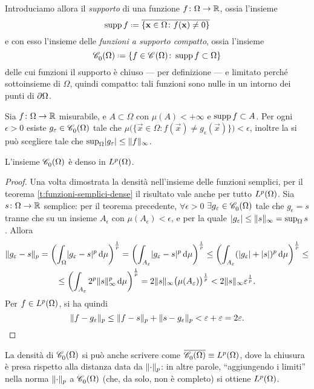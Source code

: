 Introduciamo allora il \emph{supporto} di una funzione $f\colon\Omega\to\R$, ossia l'insieme
\begin{equation*}
    \supp f\defeq\clos{\{\vec x\in\Omega\colon f(\vec x)\ne 0\}}
\end{equation*}
e con esso l'insieme delle \emph{funzioni a supporto compatto}, ossia l'insieme
\begin{equation*}
    \contsc{\Omega}\defeq\{f\in\cont{\Omega}\colon \supp f\subset\Omega\}
\end{equation*}
delle cui funzioni il supporto è chiuso --- per definizione --- e limitato perch\'e sottoinsieme di $\Omega$, quindi compatto: tali funzioni sono nulle in un intorno dei punti di $\boundary\Omega$.
\begin{teorema}[Lusin] \label{t:lusin}
    Sia $f\colon\Omega\to\R$ misurabile, e $A\subset\Omega$ con $\mu(A)<+\infty$ e $\supp f\subset A$.
    Per ogni $\epsilon>0$ esiste $g_\epsilon\in\contsc{\Omega}$ tale che $\mu\bigl(\{\vec x\in\Omega\colon f(\vec x)\ne g_\epsilon(\vec x)\}\bigr)<\epsilon$, inoltre la si può scegliere tale che $\sup_\Omega\abs{g_\epsilon}\le\norm{f}_{\infty}$.
\end{teorema}
\begin{teorema} \label{t:funzioni-continue-supporto-compatto-dense}
    L'insieme $\contsc{\Omega}$ è denso in $\leb[p]{\Omega}$.
\end{teorema}
\begin{proof}
    Una volta dimostrata la densità nell'insieme delle funzioni semplici, per il teorema \ref{t:funzioni-semplici-dense} il risultato vale anche per tutto $\leb[p]{\Omega}$.
    Sia $s\colon\Omega\to\R$ semplice: per il teorema precedente, $\forall\epsilon>0$ $\exists g_\epsilon\in\contsc{\Omega}$ tale che $g_\epsilon=s$ tranne che su un insieme $A_\epsilon$ con $\mu(A_\epsilon)<\epsilon$, e per la quale $\abs{g_\epsilon}\le\norm{s}_\infty=\sup_\Omega s$.
    Allora
    \begin{multline}
        \norm{g_\epsilon-s}_p=
        \biggl(\int_\Omega\abs{g_\epsilon-s}^p\,\dd\mu\biggr)^\frac1{p}=
        \biggl(\int_{A_\epsilon}\abs{g_\epsilon-s}^p\,\dd\mu\biggr)^\frac1{p}\le
        \biggl(\int_{A_\epsilon}(\abs{g_\epsilon}+\abs{s})^p\,\dd\mu\biggr)^\frac1{p}\le\\ \le
        \biggl(\int_{A_\epsilon}2^p\norm{s}_\infty^p\,\dd\mu\biggr)^\frac1{p}=
        2\norm{s}_\infty\bigl(\mu(A_\epsilon)\bigr)^\frac1{p}<
        2\norm{s}_\infty\epsilon^\frac1{p}.
    \end{multline}
    Per $f\in\leb[p]{\Omega}$, si ha quindi
    \begin{equation}
        \norm{f-g_\epsilon}_p\le
        \norm{f-s}_p+\norm{s-g_\epsilon}_p<
        \epsilon+\epsilon=
        2\epsilon.\qedhere
    \end{equation}
\end{proof}
La densità di $\contsc{\Omega}$ si può anche scrivere come $\clos{\contsc{\Omega}}\equiv\leb[p]{\Omega}$, dove la chiusura è presa rispetto alla distanza data da $\norm{\cdot}_p$: in altre parole, ``aggiungendo i limiti'' nella norma $\norm{\cdot}_p$ a $\contsc{\Omega}$ (che, da solo, non è completo) si ottiene $\leb[p]{\Omega}$.

